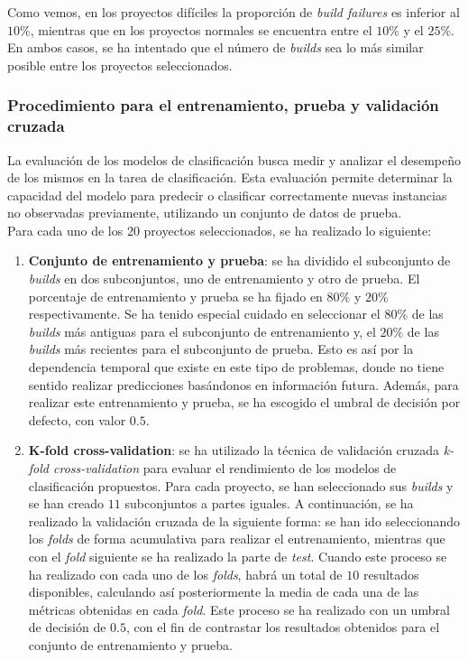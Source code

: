 Como vemos, en los proyectos difíciles la proporción de \textit{build failures} es inferior al
$10\%$, mientras que en los proyectos normales se encuentra entre el $10\%$ y el $25\%$. En
ambos casos, se ha intentado que el número de \textit{builds} sea lo más similar posible entre
los proyectos seleccionados.\\

\subsubsection{Procedimiento para el entrenamiento, prueba  y validación cruzada}
La evaluación de los modelos de clasificación busca medir y analizar el desempeño de los mismos
en la tarea de clasificación. Esta evaluación permite determinar la capacidad del modelo para
predecir o clasificar correctamente nuevas instancias no observadas previamente, utilizando un
conjunto de datos de prueba.\\

\noindent Para cada uno de los $20$ proyectos seleccionados, se ha realizado lo siguiente:


\begin{enumerate}
    \item \textbf{Conjunto de entrenamiento y prueba}: se ha dividido el subconjunto de
    \textit{builds} en dos subconjuntos, uno de entrenamiento y otro de prueba. El porcentaje
    de entrenamiento y prueba se ha fijado en $80\%$ y $20\%$ respectivamente. Se ha tenido
    especial cuidado en seleccionar el $80\%$ de las \textit{builds} más antiguas para el
    subconjunto de entrenamiento y, el $20\%$ de las \textit{builds} más recientes para el
    subconjunto de prueba. Esto es así por la dependencia temporal que existe en este tipo de
    problemas, donde no tiene sentido realizar predicciones basándonos en información futura.
    Además, para realizar este entrenamiento y prueba, se ha escogido el umbral de decisión
    por defecto, con valor $0.5$.\\

    \item \textbf{K-fold cross-validation}: se ha utilizado la técnica de validación cruzada
    \textit{k-fold cross-validation} para evaluar el rendimiento de los modelos de clasificación
    propuestos. Para cada proyecto, se han seleccionado sus \textit{builds} y se han creado $11$
    subconjuntos a partes iguales. A continuación, se ha realizado la validación cruzada de
    la siguiente forma: se han ido seleccionando los \textit{folds} de forma acumulativa para
    realizar el entrenamiento, mientras que con el \textit{fold} siguiente se ha realizado la
    parte de \textit{test}. Cuando este proceso se ha realizado con cada uno de los \textit{folds},
    habrá un total de $10$ resultados disponibles, calculando así posteriormente la media de cada
    una de las métricas obtenidas en cada \textit{fold}. Este proceso se ha realizado
    con un umbral de decisión de $0.5$, con el fin de contrastar los resultados obtenidos para el 
    conjunto de entrenamiento y prueba.\\
\end{enumerate}


